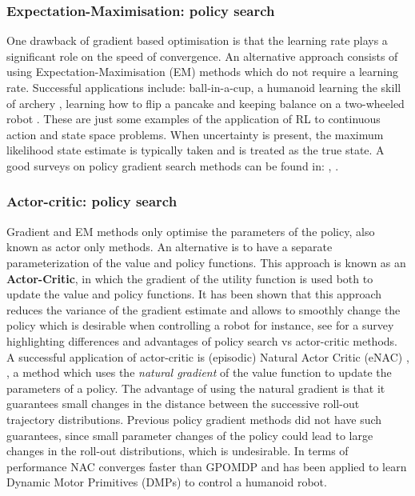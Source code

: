 \subsubsection{Expectation-Maximisation: policy search}

One drawback of gradient based optimisation is that the learning rate  plays a significant role on the speed of convergence. 
An alternative approach consists of using Expectation-Maximisation (EM) methods \cite{PoWER_2009} which do not require a learning rate. Successful applications include: ball-in-a-cup, a humanoid learning the skill of archery \cite{archery_2010}, learning how to 
flip a pancake \cite{pancake_2010} and keeping balance on a two-wheeled robot \cite{Wang2016}. These are just some examples 
of the application of RL to continuous action and state space problems. When uncertainty is present, the maximum likelihood state estimate is typically taken 
and is treated as the true state. A good surveys on policy gradient search methods can be found in: \cite{p_search_surv_2011}, \cite{RL_robots_surv_2013}.

\subsubsection{Actor-critic: policy search}

Gradient and EM methods only optimise the parameters of the policy, also known as actor only methods. An alternative  
is to have a separate parameterization of the value and policy functions. This approach is known as an \textbf{Actor-Critic}, in which the gradient of the utility function is used both to update 
the value and policy functions. It has been shown that this approach reduces the variance of the gradient estimate and allows
to smoothly change the policy which is desirable when controlling a robot for instance, see \cite{ac_survey_2012} for a 
survey highlighting differences and advantages of policy search vs actor-critic methods. A successful application of actor-critic is (episodic) Natural Actor Critic (eNAC) \cite{eNAC_2003}, \cite{NAC_2008}, a method which uses the \textit{natural gradient} of the value function to update the parameters of a policy. The advantage of using the natural gradient is that it guarantees small changes in the distance between the successive roll-out trajectory distributions. Previous policy gradient methods did not have such guarantees, since small parameter changes of the policy could lead to large changes in the roll-out distributions, which is undesirable. In terms of performance NAC converges faster than GPOMDP and has been applied to learn Dynamic Motor Primitives (DMPs) to control a humanoid robot. 

